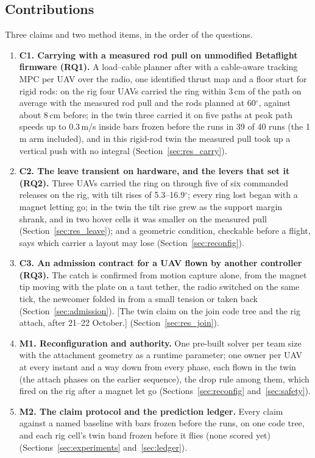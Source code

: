 \subsection{Contributions}
\label{sec:contributions}

Three claims and two method items, in the order of the questions.
\begin{enumerate}
    \item \textbf{C1. Carrying with a measured rod pull on unmodified Betaflight firmware (RQ1).} A load--cable planner
    after \cite{tudelft} with a cable-aware tracking MPC per UAV over the radio, one identified thrust map and a floor
    start for rigid rods: on the rig four UAVs carried the ring within 3\,cm of the path on average with the measured rod
    pull and the rods planned at 60$^\circ$, against about 8\,cm before; in the twin three carried it on five paths at
    peak path speeds up to 0.3\,m/s inside bars frozen before the runs in 39 of 40 runs (the 1\,m arm included), and in this rigid-rod twin the measured pull took up a vertical
    push with no integral (Section~\ref{sec:res_carry}).
    \item \textbf{C2. The leave transient on hardware, and the levers that set it (RQ2).} Three UAVs carried the ring on
    through five of six commanded releases on the rig, with tilt rises of 5.3--16.9$^\circ$; every ring lost began with
    a magnet letting go; in the twin the tilt rise grew as the support margin shrank, and in two hover cells it was
    smaller on the measured pull (Section~\ref{sec:res_leave}); and a geometric condition, checkable before a flight, says which carrier a layout may
    lose (Section~\ref{sec:reconfig}).
    \item \textbf{C3. An admission contract for a UAV flown by another controller (RQ3).} The catch is confirmed from
    motion capture alone, from the magnet tip moving with the plate on a taut tether, the radio switched on the same
    tick, the newcomer folded in from a small tension or taken back (Section~\ref{sec:admission}). [The twin claim on
    the join code tree and the rig attach, after 21--22 October.] (Section~\ref{sec:res_join}).
    \item \textbf{M1. Reconfiguration and authority.} One pre-built solver per team size with the attachment geometry
    as a runtime parameter; one owner per UAV at every instant and a way down from every phase, each flown in the twin
    (the attach phases on the earlier sequence), the drop rule among them, which fired on the rig after a magnet let go (Sections~\ref{sec:reconfig} and~\ref{sec:safety}).
    \item \textbf{M2. The claim protocol and the prediction ledger.} Every claim against a named baseline with bars
    frozen before the runs, on one code tree, and each rig cell's twin band frozen before it flies (none scored yet)
    (Sections~\ref{sec:experiments} and~\ref{sec:ledger}).
\end{enumerate}

